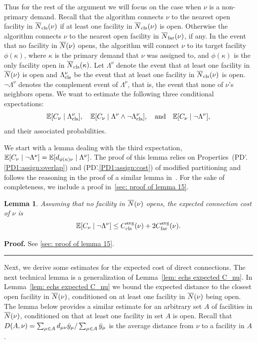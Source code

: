 \documentclass[oneside,final]{ucr}
\newtheorem{lemma}[theorem]{Lemma}
\newenvironment{proof}[1][Proof]{\textbf{#1.} }{\ \rule{0.5em}{0.5em}}
\begin{document}
Thus for the rest of the argument we will focus on the case when $\nu$
is a non-primary demand.  Recall that the
algorithm connects $\nu$ to the nearest open facility in
${\overline{N}}_{{\mbox{\scriptsize\rm cls}}}(\nu)$ if at least one facility in ${\overline{N}}_{{\mbox{\scriptsize\rm cls}}}(\nu)$ is
open. Otherwise the algorithm connects $\nu$ to the nearest open
facility in ${\overline{N}}_{{\mbox{\scriptsize\rm far}}}(\nu)$, if any. In the event that no facility in
${\overline{N}}(\nu)$ opens, the algorithm will connect $\nu$ to its target
facility $\phi(\kappa)$, where $\kappa$ is the primary demand that
$\nu$ was assigned to, and $\phi(\kappa)$ is the only facility open in
${\overline{N}}_{{\mbox{\scriptsize\rm cls}}}(\kappa)$. Let $\Lambda^\nu$ denote the event that at least
one facility in ${\overline{N}}(\nu)$ is open and $\Lambda^\nu_{{\mbox{\scriptsize\rm cls}}}$ be the
event that at least one facility in ${\overline{N}}_{{\mbox{\scriptsize\rm cls}}}(\nu)$ is open.
$\neg \Lambda^\nu$ denotes the complement event of $\Lambda^\nu$, that is,
the event that none of $\nu$'s neighbors opens. 
We want to estimate the following three conditional expectations: 
%
\begin{equation*}
  \mathbb{E}[C_{\nu} \mid
  \Lambda^\nu_{{\mbox{\scriptsize\rm cls}}}],\quad \mathbb{E}[C_{\nu} \mid \Lambda^\nu \wedge \neg
  \Lambda^\nu_{{\mbox{\scriptsize\rm cls}}}], \quad\text{and}\quad \mathbb{E}[C_{\nu} \mid \neg \Lambda^\nu], 
\end{equation*}
%
and their associated probabilities.

We start with a lemma dealing with the third expectation,
$\mathbb{E}[C_\nu\mid\neg \Lambda^{\nu}] = \mathbb{E}[d_{\phi(\kappa)\nu} \mid
\Lambda^{\nu}]$. The proof of this lemma relies on
Properties~(PD'.\ref{PD1:assign:overlap}) and
(PD'.\ref{PD1:assign:cost}) of modified partitioning and follows the
reasoning in the proof of a similar lemma
in~\cite{ByrkaGS10,ByrkaA10}.  For the sake of completeness, we
include a proof in~\ref{sec: proof of lemma 15}.


\begin{lemma}\label{lem: EBGS target connection cost}
Assuming that no facility in ${\overline{N}}(\nu)$ opens, the expected connection
cost of $\nu$ is
%
\begin{equation}
  \mathbb{E}[C_{\nu} \mid \neg \Lambda^{\nu}] \leq
  C_{{\mbox{\scriptsize\rm cls}}}^{{\mbox{\scriptsize\rm avg}}}(\nu) + 2C_{{\mbox{\scriptsize\rm far}}}^{{\mbox{\scriptsize\rm avg}}}(\nu).
  \label{eqn: expected connection cost target facility}
\end{equation}
%
\end{lemma}
\begin{proof}
See \ref{sec: proof of lemma 15}.
\end{proof}

Next, we derive some estimates for the expected cost of direct
connections.  The next technical lemma is a generalization of
Lemma~\ref{lem: echs expected C_nu}. In Lemma~\ref{lem: echs expected
  C_nu} we bound the expected distance to the closest open facility in
${\overline{N}}(\nu)$, conditioned on at least one facility in ${\overline{N}}(\nu)$
being open. The lemma below provides a similar estimate for an
arbitrary set $A$ of facilities in ${\overline{N}}(\nu)$, conditioned on that
at least one facility in set $A$ is open.  Recall that $D(A,\nu) =
\sum_{\mu \in A} d_{\mu\nu} {\bar y}_{\mu} / \sum_{\mu \in A}
{\bar y}_{\mu}$ is the average distance from $\nu$ to a facility in $A$. 
\end{document}

